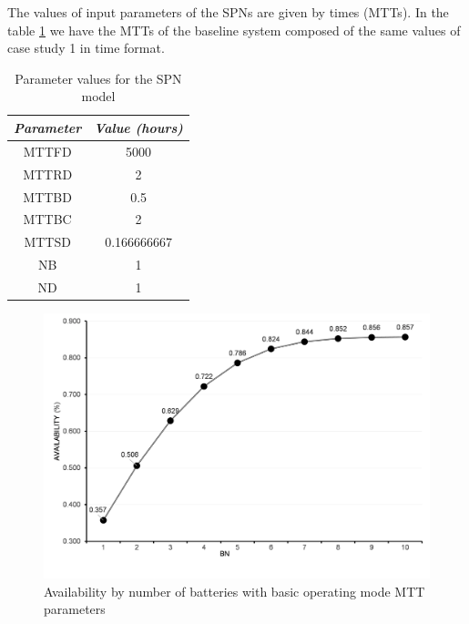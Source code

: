 \documentclass[conference]{IEEEtran}
\begin{document}
The values of input parameters of the SPNs are given by times (MTTs). In the table \ref{tab:basic_spn_parameter_values} we have the MTTs of the baseline system composed of the same values of case study 1 in time format.


\begin{table}[htbp]
\caption{Parameter values for the SPN model}
\begin{center}
\begin{tabular}{|c|c|}
\hline
\textbf{\textit{Parameter}} & \textbf{\textit{Value (hours)}} \\
\hline
  MTTFD & 5000\\
 MTTRD & 2\\
 MTTBD & 0.5 \\ 
 MTTBC & 2 \\
 MTTSD & 0.166666667 \\
 NB & 1 \\
 ND & 1 \\
\hline
\end{tabular}
\label{tab:basic_spn_parameter_values}
\end{center}
\end{table}

\begin{figure}[htbp]
\centerline{\includegraphics[scale=0.45]{img/exps/SA_006.png}}
\caption{Availability by number of batteries with basic operating mode MTT parameters}
\label{fig:basic_spn_sa_battery}
\end{figure}
\end{document}
